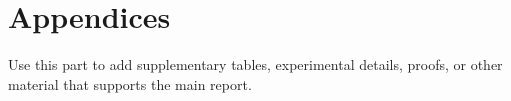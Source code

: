\chapter{Appendices}

Use this part to add supplementary tables, experimental details, proofs, or
other material that supports the main report.
